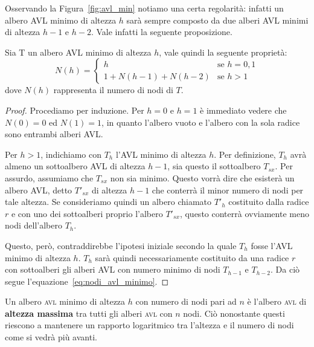 Osservando la Figura~\ref{fig:avl_min} notiamo una certa regolarità: infatti un albero \textsc{AVL} minimo di altezza $h$ sarà sempre composto da due alberi \textsc{AVL} minimi di altezza $h-1$ e $h-2$. Vale infatti la seguente proposizione.


\begin{propbox}
Sia T un albero \textsc{AVL} minimo di altezza $h$, vale quindi la seguente proprietà:
\begin{equation}\label{eq:nodi_avl_minimo}
	N(h) = \left \lbrace \begin{array}{ll}
		h & \mbox{se } h=0,1 \\
		1+ N(h-1) + N(h-2) & \mbox{se } h > 1
	\end{array}
	\right.
\end{equation}
dove $N(h)$ rappresenta il numero di nodi di $T$.

\end{propbox}
\begin{proof}
Procediamo per induzione. Per $h=0$ e $h=1$ è immediato vedere che $N(0)=0$ ed $N(1)=1$, in quanto l'albero vuoto e l'albero con la sola radice sono entrambi alberi \textsc{AVL}.

Per $h>1$, indichiamo con $T_{h}$ l'\textsc{AVL} minimo di altezza $h$. Per definizione, $T_{h}$ avrà almeno un sottoalbero \textsc{AVL} di altezza $h-1$, sia questo il sottoalbero $T_{sx}$. Per assurdo, assumiamo che $T_{sx}$ non sia minimo. Questo vorrà dire che esisterà un albero \textsc{AVL}, detto $T'_{sx}$ di altezza $h-1$ che conterrà il minor numero di nodi per tale altezza. Se consideriamo quindi un albero chiamato $T'_{h}$ costituito dalla radice $r$ e con uno dei sottoalberi proprio l'albero $T'_{sx}$, questo conterrà ovviamente meno nodi dell'albero $T_{h}$.

Questo, però, contraddirebbe l'ipotesi iniziale secondo la quale $T_{h}$ fosse l'\textsc{AVL} minimo di altezza $h$. $T_{h}$ sarà quindi necessariamente costituito da una radice $r$ con sottoalberi gli alberi \textsc{AVL} con numero minimo di nodi $T_{h-1}$ e $T_{h-2}$. Da ciò segue l'equazione~\ref{eq:nodi_avl_minimo}.
\end{proof}


\begin{osservation}
Un albero \textsc{avl} minimo di altezza $h$ con numero di nodi pari ad $n$ è l'albero \textsc{avl} di \textbf{altezza massima} tra tutti gli alberi \textsc{avl} con $n$ nodi. Ciò nonostante questi riescono a mantenere un rapporto logaritmico tra l'altezza e il numero di nodi come si vedrà più avanti.
\end{osservation}


